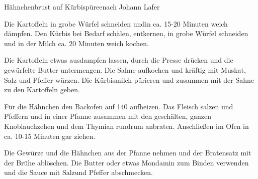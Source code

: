 \begin{recipe}{Hähnchenbrust auf Kürbispüree}{nach Johann Lafer}


  \steps
  Die Kartoffeln in grobe Würfel schneiden undin ca. 15-20 Minuten weich 
  dämpfen. Den Kürbis bei Bedarf schälen, entkernen, in grobe Würfel
  schneiden und in der Milch ca. 20 Minuten weich kochen.

  Die Kartoffeln etwas ausdampfen lassen, durch die Presse drücken und die
  gewürfelte Butter untermengen. Die Sahne aufkochen und kräftig mit Muskat,
  Salz und Pfeffer würzen. Die Kürbismilch pürieren und zusammen mit der Sahne
  zu den Kartoffeln geben.

  Für die Hähnchen den Backofen auf 140 \celsius aufheizen. Das Fleisch salzen
  und Pfeffern und in einer Pfanne zusammen mit den geschälten, ganzen
  Knoblauchzehen und dem Thymian rundrum anbraten. Anschließen im Ofen in ca.
  10-15 Minuten gar ziehen.

  Die Gewürze und die Hähnchen aus der Pfanne nehmen und der Bratensatz mit der
  Brühe ablöschen. Die Butter oder etwas Mondamin zum Binden verwenden und die
  Sauce mit Salzund Pfeffer abschmecken.
\end{recipe}
